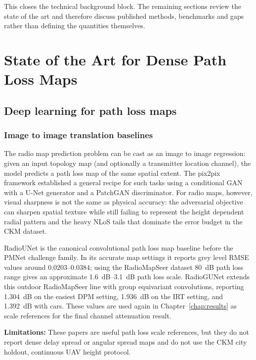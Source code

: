 This closes the technical background block. The remaining sections review the
state of the art and therefore discuss published methods, benchmarks and gaps
rather than defining the quantities themselves.

\section{State of the Art for Dense Path Loss Maps}
\label{sec:soa_pathloss_sota}

\subsection{Deep learning for path loss maps}
\label{sec:soa_dl}

\subsubsection{Image to image translation baselines}

The radio map prediction problem can be cast as an image to image regression:
given an input topology map (and optionally a transmitter location channel), the
model predicts a path loss map of the same spatial extent.  The pix2pix framework
\cite{isola2017pix2pix} established a general recipe for such tasks using a
conditional GAN with a U-Net generator and a PatchGAN discriminator.  For radio
maps, however, visual sharpness is not the same as physical accuracy: the
adversarial objective can sharpen spatial texture while still failing to
represent the height dependent radial pattern and the heavy NLoS tails that
dominate the error budget in the CKM dataset.

RadioUNet \cite{radiounet2020} is the canonical convolutional path loss map
baseline before the PMNet challenge family. In its accurate map settings it
reports grey level RMSE values around \(0.0203\)--\(0.0384\); using the
RadioMapSeer dataset \SI{80}{dB} path loss range \cite{dataset2212} gives an
approximate \SI{1.6}{dB}--\SI{3.1}{dB} path loss scale. RadioGUNet
\cite{radiogunet2025} extends this outdoor
RadioMapSeer line with group equivariant convolutions, reporting
\SI{1.304}{dB} on the easiest DPM setting, \SI{1.936}{dB} on the IRT setting,
and \SI{1.392}{dB} with cars. These values are used again in
Chapter~\ref{chap:results} as scale references for the final channel attenuation result.

\textbf{Limitations:} These papers are useful path loss scale references, but
they do not report dense delay spread or angular spread maps and do not use the
CKM city holdout, continuous UAV height protocol.

